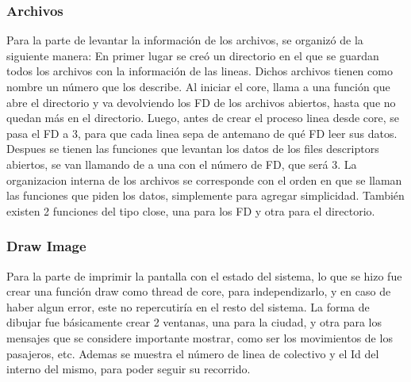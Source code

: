 \documentclass[a4paper,10pt]{elsart}
\begin{document}
\subsubsection{Archivos}
Para la parte de levantar la informaci\'on de los archivos, se organiz\'o de la siguiente manera:
En primer lugar se cre\'o un directorio en el que se guardan todos los archivos con la informaci\'on de las lineas. Dichos archivos tienen como nombre un n\'umero que los describe.
Al iniciar el core, llama a una funci\'on que abre el directorio y va devolviendo los FD de los archivos abiertos, hasta que no quedan m\'as en el directorio.
Luego, antes de crear el proceso linea desde core, se pasa el FD a 3, para que cada linea sepa de antemano de qu\'e FD leer sus datos.
Despues se tienen las funciones que levantan los datos de los files descriptors abiertos, se van llamando de a una con el n\'umero de FD, que ser\'a 3.
La organizacion interna de los archivos se corresponde con el orden en que se llaman las funciones que piden los datos, simplemente para agregar simplicidad.
Tambi\'en existen 2 funciones del tipo close, una para los FD y otra para el directorio.

\subsubsection{Draw Image}
Para la parte de imprimir la pantalla con el estado del sistema, lo que se hizo fue crear una funci\'on draw como thread de core, para independizarlo, y en caso de haber algun error, este no repercutir\'ia en el resto del sistema.
La forma de dibujar fue b\'asicamente crear 2 ventanas, una para la ciudad, y otra para los mensajes que se considere importante mostrar, como ser los movimientos de los pasajeros, etc.
Ademas se muestra el n\'umero de linea de colectivo y el Id del interno del mismo, para poder seguir su recorrido.
\end{document}
